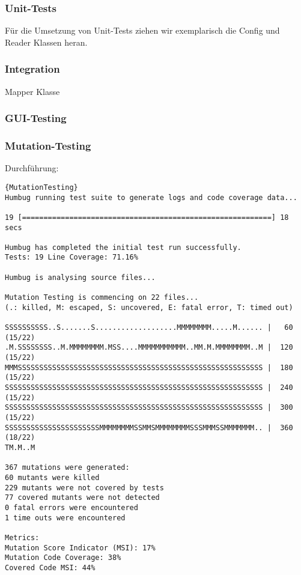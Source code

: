 \subsubsection{Unit-Tests}
Für die Umsetzung von Unit-Tests ziehen wir exemplarisch die Config und Reader Klassen heran.





\subsubsection{Integration}

Mapper Klasse



\subsubsection{GUI-Testing}

\subsubsection{Mutation-Testing}

Durchführung:
\begin{lstlisting}[caption=Ausführung des Mutation-Testing]{MutationTesting}
Humbug running test suite to generate logs and code coverage data...

19 [==========================================================] 18 secs

Humbug has completed the initial test run successfully.
Tests: 19 Line Coverage: 71.16%

Humbug is analysing source files...

Mutation Testing is commencing on 22 files...
(.: killed, M: escaped, S: uncovered, E: fatal error, T: timed out)

SSSSSSSSSS..S.......S...................MMMMMMMM.....M...... |   60 (15/22)
.M.SSSSSSSS..M.MMMMMMMM.MSS....MMMMMMMMMMM..MM.M.MMMMMMMM..M |  120 (15/22)
MMMSSSSSSSSSSSSSSSSSSSSSSSSSSSSSSSSSSSSSSSSSSSSSSSSSSSSSSSSS |  180 (15/22)
SSSSSSSSSSSSSSSSSSSSSSSSSSSSSSSSSSSSSSSSSSSSSSSSSSSSSSSSSSSS |  240 (15/22)
SSSSSSSSSSSSSSSSSSSSSSSSSSSSSSSSSSSSSSSSSSSSSSSSSSSSSSSSSSSS |  300 (15/22)
SSSSSSSSSSSSSSSSSSSSSSMMMMMMMMSSMMSMMMMMMMMSSSMMMSSMMMMMMM.. |  360 (18/22)
TM.M..M

367 mutations were generated:
60 mutants were killed
229 mutants were not covered by tests
77 covered mutants were not detected
0 fatal errors were encountered
1 time outs were encountered

Metrics:
Mutation Score Indicator (MSI): 17%
Mutation Code Coverage: 38%
Covered Code MSI: 44%
\end{lstlisting}



